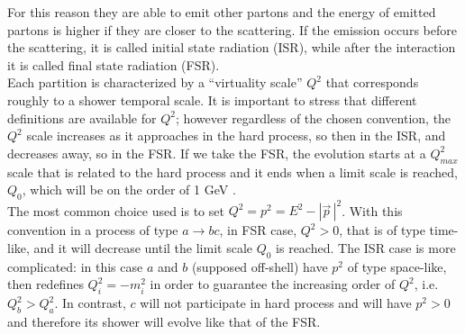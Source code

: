 For this reason they are able to emit other partons and  the energy of emitted partons is higher if they are closer to the scattering.
If the emission occurs before the scattering, it is called initial state radiation (ISR), while after the interaction it is called final state radiation (FSR). \\
Each partition is characterized by a  ``virtuality scale'' $Q^2$ that corresponds roughly to a shower temporal scale.
It is important to stress that different definitions are available for $Q^2$; however regardless of the chosen convention, the $ Q^2 $ scale increases as it approaches in the hard process, so then in the ISR, and decreases away, so in the FSR. If we take the FSR,  the evolution starts at a $ Q^2_ {max} $ scale that is related to the hard process and it ends when a limit scale is reached, $ Q_0 $, which will be on the order of 1 GeV .\\
The most common choice used is to set  $Q^2=p^2=E^2- |\vec{p}\,|^2$. With this convention in a process of type  $a \rightarrow bc$, in FSR case, $Q^2 >0$, that is of type time-like, and it will decrease until the limit scale $ Q_0 $ is reached.
The ISR case is more complicated: in this case $ a $ and $ b $  (supposed off-shell) have $ p^2 $ of type space-like, then redefines $ Q_i^2 = -m_i^2 $ in order to guarantee the increasing order of $ Q^2 $, i.e. $ Q_b^2> Q_a^2 $.
In contrast, $ c $ will not participate in hard process and will have $ p^2> 0 $ and therefore its shower will evolve like that of the FSR.


